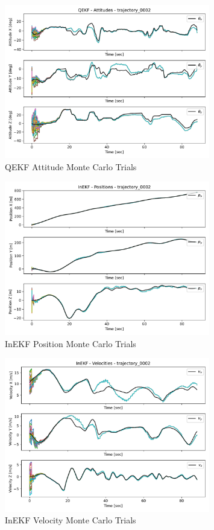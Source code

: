 \begin{figure}[H]
    \centering
    \includegraphics[width=0.8\textwidth]{figs/QEKF_trajectory_0002_attitudes.pdf}
    \caption{QEKF Attitude Monte Carlo Trials}
    \label{fig: QEKF Attitude Monte Carlo Trials}
\end{figure}

\begin{figure}[H]
    \centering
    \includegraphics[width=0.8\textwidth]{figs/InEKF_trajectory_0002_positions.pdf}
    \caption{InEKF Position Monte Carlo Trials}
    \label{fig: InEKF Position Monte Carlo Trials}
\end{figure}

\begin{figure}[H]
    \centering
    \includegraphics[width=0.8\textwidth]{figs/InEKF_trajectory_0002_velocities.pdf}
    \caption{InEKF Velocity Monte Carlo Trials}
    \label{fig: InEKF Velocity Monte Carlo Trials}
\end{figure}

